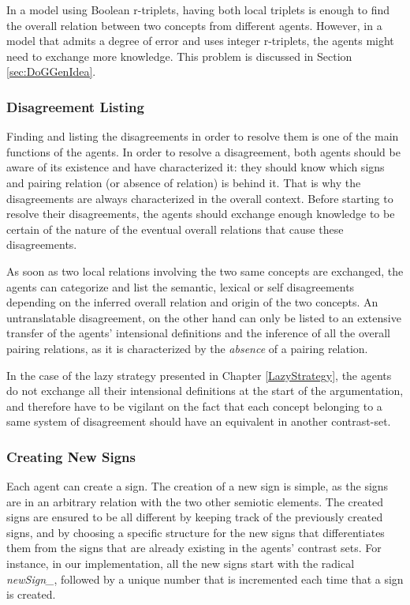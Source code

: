 In a model using Boolean r-triplets, having both local triplets is enough to find the overall relation between two concepts from different agents. However, in a model that admits a degree of error and uses integer r-triplets, the agents might need to exchange more knowledge. This problem is discussed in Section \ref{sec:DoGGenIdea}.

\subsubsection{Disagreement Listing}
\label{sec:funListD}

Finding and listing the disagreements in order to resolve them is one of the main functions of the agents. In order to resolve a disagreement, both agents should be aware of its existence and have characterized it: they should know which signs and pairing relation (or absence of relation) is behind it. That is why the disagreements are always characterized in the overall context. Before starting to resolve their disagreements, the agents should exchange enough knowledge to be certain of the nature of the eventual overall relations that cause these disagreements.

As soon as two local relations involving the two same concepts are exchanged, the agents can categorize and list the semantic, lexical or self disagreements depending on the inferred overall relation and origin of the two concepts. An untranslatable disagreement, on the other hand can only be listed to an extensive transfer of the agents' intensional definitions and the inference of all the overall pairing relations, as it is characterized by the \emph{absence} of a pairing relation.

In the case of the lazy strategy presented in Chapter \ref{LazyStrategy}, the agents do not exchange all their intensional definitions at the start of the argumentation, and therefore have to be vigilant on the fact that each concept belonging to a same system of disagreement should have an equivalent in another contrast-set.

\subsubsection{Creating New Signs}
\label{sec:funCreaSign}

Each agent can create a sign. The creation of a new sign is simple, as the signs are in an arbitrary relation with the two other semiotic elements. The created signs are ensured to be all different by keeping track of the previously created signs, and by choosing a specific structure for the new signs that differentiates them from the signs that are already existing in the agents' contrast sets. For instance, in our implementation, all the new signs start with the radical \emph{newSign\_}, followed by a unique number that is incremented each time that a sign is created.

